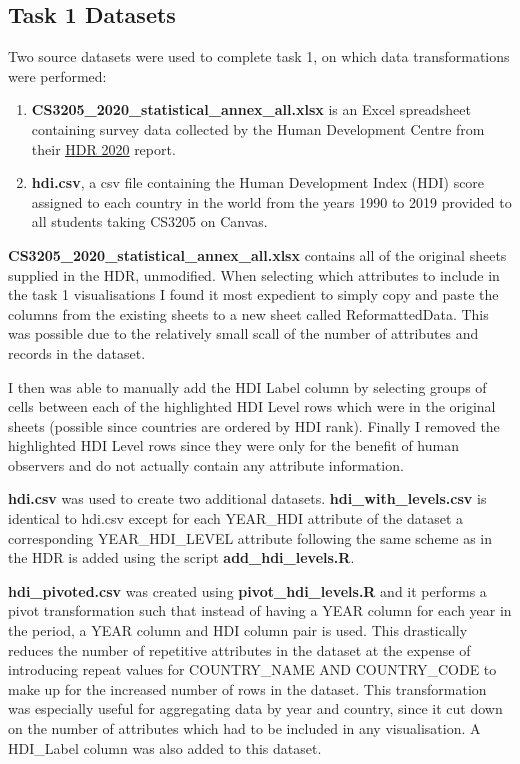 \documentclass[11pt,a4paper,final]{article}
\begin{document}
\subsection{Task 1 Datasets}
Two source datasets were used to complete task 1, on which data transformations were performed:
\begin{enumerate}
	\item \textbf{CS3205\_2020\_statistical\_annex\_all.xlsx} is an Excel spreadsheet containing survey data collected by the Human Development Centre from their \hyperref[sec:References]{\underline{HDR 2020}} report.
	\item \textbf{hdi.csv}, a csv file containing the Human Development Index (HDI) score assigned to each country in the world from the years 1990 to 2019 provided to all students taking CS3205 on Canvas.
\end{enumerate}

\textbf{CS3205\_2020\_statistical\_annex\_all.xlsx} contains all of the original sheets supplied in the HDR, unmodified. When selecting which attributes to include in the task 1 visualisations I found it most expedient to simply copy and paste the columns from the existing sheets to a new sheet called ReformattedData. This was possible due to the relatively small scall of the number of attributes and records in the dataset.

I then was able to manually add the HDI Label column by selecting groups of cells between each of the highlighted HDI Level rows which were in the original sheets (possible since countries are ordered by HDI rank). Finally I removed the highlighted HDI Level rows since they were only for the benefit of human observers and do not actually contain any attribute information.

\textbf{hdi.csv} was used to create two additional datasets. \textbf{hdi\_with\_levels.csv} is identical to hdi.csv except for each YEAR\_HDI attribute of the dataset a corresponding YEAR\_HDI\_LEVEL attribute following the same scheme as in the HDR is added using the script \textbf{add\_hdi\_levels.R}.

\textbf{hdi\_pivoted.csv} was created using \textbf{pivot\_hdi\_levels.R} and it performs a pivot transformation such that instead of having a YEAR column for each year in the period, a YEAR column and HDI column pair is used. This drastically reduces the number of repetitive attributes in the dataset at the expense of introducing repeat values for COUNTRY\_NAME AND COUNTRY\_CODE to make up for the increased number of rows in the dataset. This transformation was especially useful for aggregating data by year and country, since it cut down on the number of attributes which had to be included in any visualisation. A HDI\_Label column was also added to this dataset.
\end{document}
